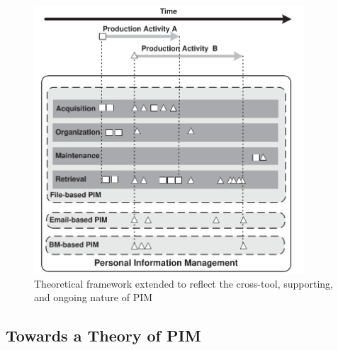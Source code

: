 \begin{figure}[hbtp]
	\begin{center}
		\leavevmode
		\includegraphics[height=10cm]{pictures/discussion/PIM-ongoing-model.pdf}
	\end{center}
	\caption{Theoretical framework extended to reflect the cross-tool, supporting, and ongoing nature of PIM}
	\label{fig:discussion:ongoing-model}
\end{figure}





\subsection{Towards a Theory of PIM}
\label{discussion:towards-theory}

